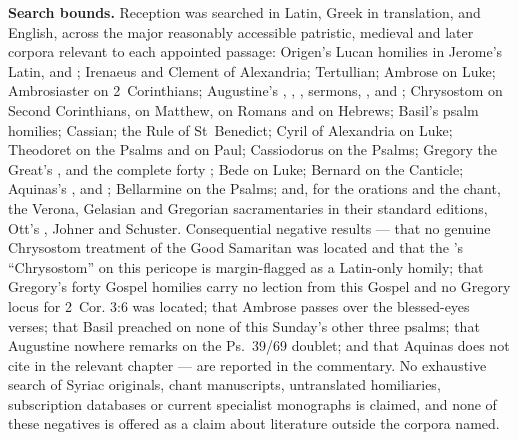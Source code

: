 \textbf{Search bounds.} Reception was searched in Latin, Greek in translation,
and English, across the major reasonably accessible patristic, medieval and
later corpora relevant to each appointed passage: Origen's Lucan homilies in
Jerome's Latin,  and ; Irenaeus and
Clement of Alexandria; Tertullian; Ambrose on Luke; Ambrosiaster on
2~Corinthians; Augustine's , , , sermons, ,  and ;
Chrysostom on Second Corinthians, on Matthew, on Romans and on Hebrews; Basil's
psalm homilies; Cassian; the Rule of St~Benedict; Cyril of Alexandria on Luke;
Theodoret on the Psalms and on Paul; Cassiodorus on the Psalms; Gregory the
Great's ,  and the complete forty
; Bede on Luke; Bernard on the Canticle; Aquinas's
,  and ; Bellarmine on the Psalms; and, for the orations and the chant, the
Verona, Gelasian and Gregorian sacramentaries in their standard editions,
Ott's , Johner and Schuster. Consequential negative results
--- that no genuine Chrysostom treatment of the Good Samaritan was located and
that the 's ``Chrysostom'' on this pericope is
margin-flagged as a Latin-only homily; that Gregory's forty Gospel homilies
carry no lection from this Gospel and no Gregory locus for 2~Cor. 3:6 was
located; that Ambrose passes over the blessed-eyes verses; that Basil preached
on none of this Sunday's other three psalms; that Augustine nowhere remarks on
the Ps.\ 39/69 doublet; and that Aquinas does not cite  in the relevant chapter --- are reported in the commentary. No exhaustive search
of Syriac originals, chant manuscripts, untranslated homiliaries, subscription
databases or current specialist monographs is claimed, and none of these
negatives is offered as a claim about literature outside the corpora named.

